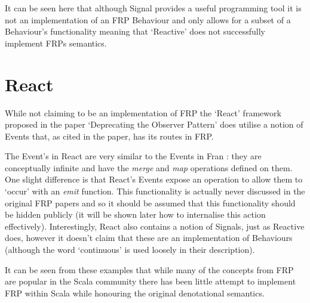       It can be seen here that although Signal provides a useful programming tool it is not an implementation
      of an FRP Behaviour and only allows for a subset of a Behaviour's functionality meaning that `Reactive'
      does not successfully implement FRPs semantics.
    
    \section{React}
      While not claiming to be an implementation of FRP the `React' framework proposed in the 
      paper `Deprecating the Observer Pattern' \cite{Maier2010} does utilise a notion of Events that, as cited in the paper,
      has its routes in FRP.
      
      The Event's in React are very similar to the Events in Fran \cite{Elliott1997}: they are conceptually infinite
      and have the \emph{merge} and \emph{map} operations defined on them. One slight difference is that React's
      Events expose an operation to allow them to `occur' with an \emph{emit} function. This functionality
      is actually never discussed in the original FRP papers and so it should be assumed that this
      functionality should be hidden publicly (it will be shown later how to internalise this action
      effectively). Interestingly, React also contains a notion of Signals, just as Reactive does, however
      it doesn't claim that these are an implementation of Behaviours (although the word `continuous' is
      used loosely in their description). 
      
  It can be seen from these examples that while many of the concepts from FRP are popular
  in the Scala community there has been little attempt to implement FRP within Scala while honouring
  the original denotational semantics.